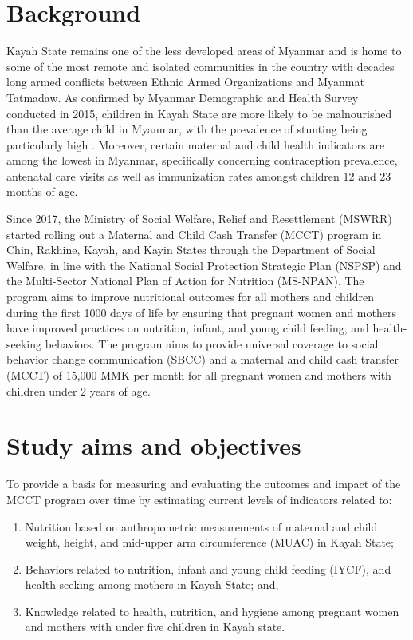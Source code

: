 \documentclass[12pt,a4paper]{article}
\begin{document}
\hypertarget{background}{%
\section{Background}\label{background}}

Kayah State remains one of the less developed areas of Myanmar and is home to some of the most remote and isolated communities in the country with decades long armed conflicts between Ethnic Armed Organizations and Myanmat Tatmadaw. As confirmed by Myanmar Demographic and Health Survey conducted in 2015, children in Kayah State are more likely to be malnourished than the average child in Myanmar, with the prevalence of stunting being particularly high \citep{MinistryofHealthandSports-MoHS/Myanmar2017}. Moreover, certain maternal and child health indicators are among the lowest in Myanmar, specifically concerning contraception prevalence, antenatal care visits as well as immunization rates amongst children 12 and 23 months of age.

Since 2017, the Ministry of Social Welfare, Relief and Resettlement (MSWRR) started rolling out a Maternal and Child Cash Transfer (MCCT) program in Chin, Rakhine, Kayah, and Kayin States through the Department of Social Welfare, in line with the National Social Protection Strategic Plan (NSPSP) and the Multi-Sector National Plan of Action for Nutrition (MS-NPAN). The program aims to improve nutritional outcomes for all mothers and children during the first 1000 days of life by ensuring that pregnant women and mothers have improved practices on nutrition, infant, and young child feeding, and health-seeking behaviors. The program aims to provide universal coverage to social behavior change communication (SBCC) and a maternal and child cash transfer (MCCT) of 15,000 MMK per month for all pregnant women and mothers with children under 2 years of age.

\hypertarget{objectives}{%
\section{Study aims and objectives}\label{objectives}}

To provide a basis for measuring and evaluating the outcomes and impact of the MCCT program over time by estimating current levels of indicators related to:

\begin{enumerate}
\def\labelenumi{\arabic{enumi}.}
\item
  Nutrition based on anthropometric measurements of maternal and child weight, height, and mid-upper arm circumference (MUAC) in Kayah State;
\item
  Behaviors related to nutrition, infant and young child feeding (IYCF), and health-seeking among mothers in Kayah State; and,
\item
  Knowledge related to health, nutrition, and hygiene among pregnant women and mothers with under five children in Kayah state.
\end{enumerate}
\end{document}
